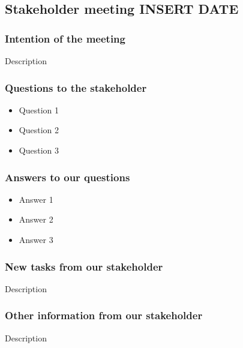 \documentclass{article}
\begin{document}
\begin{center}
\subsection*{Stakeholder meeting INSERT DATE}
\end{center}

\bigskip


\subsubsection*{Intention of the meeting}
Description


\subsubsection*{Questions to the stakeholder}
\begin{itemize}
    \item Question 1
    \item Question 2
    \item Question 3
\end{itemize}


\subsubsection*{Answers to our questions}
\begin{itemize}
    \item Answer 1
    \item Answer 2
    \item Answer 3
\end{itemize}


\subsubsection*{New tasks from our stakeholder}
Description

\subsubsection*{Other information from our stakeholder}
Description
\end{document}
